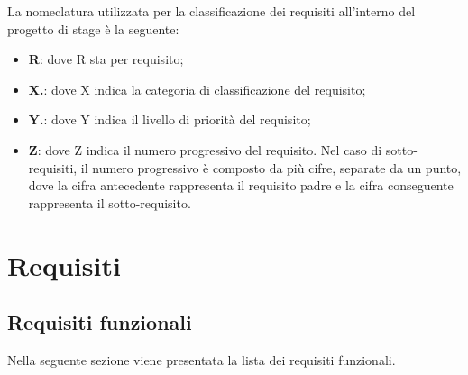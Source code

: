 \newline
La nomeclatura utilizzata per la classificazione dei requisiti all'interno del progetto di stage è la seguente:
\begin{itemize}
    \item \textbf{R}: dove R sta per requisito;
    \item \textbf{X.}: dove X indica la categoria di classificazione del requisito;
    \item \textbf{Y.}: dove Y indica il livello di priorità del requisito;
    \item \textbf{Z}: dove Z indica il numero progressivo del requisito. Nel caso di sotto-requisiti, il numero progressivo è composto da più cifre, separate da un punto,
          dove la cifra antecedente rappresenta il requisito padre e la cifra conseguente rappresenta il sotto-requisito.
\end{itemize}

\newpage
\section{Requisiti}

\subsection{Requisiti funzionali}
Nella seguente sezione viene presentata la lista dei requisiti funzionali.

